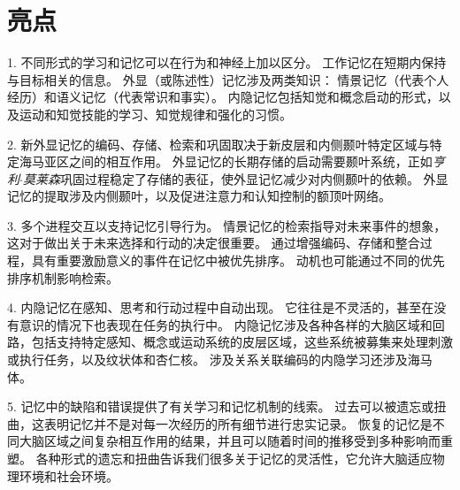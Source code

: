 \section{亮点}

1. 不同形式的学习和记忆可以在行为和神经上加以区分。
工作记忆在短期内保持与目标相关的信息。
外显（或陈述性）记忆涉及两类知识：
情景记忆（代表个人经历）和语义记忆（代表常识和事实）。
内隐记忆包括知觉和概念启动的形式，以及运动和知觉技能的学习、知觉规律和强化的习惯。 


2. 新外显记忆的编码、存储、检索和巩固取决于新皮层和内侧颞叶特定区域与特定海马亚区之间的相互作用。
外显记忆的长期存储的启动需要颞叶系统，正如\textit{亨利$\cdot$莫莱森}巩固过程稳定了存储的表征，使外显记忆减少对内侧颞叶的依赖。
外显记忆的提取涉及内侧颞叶，以及促进注意力和认知控制的额顶叶网络。


3. 多个进程交互以支持记忆引导行为。
情景记忆的检索指导对未来事件的想象，这对于做出关于未来选择和行动的决定很重要。
通过增强编码、存储和整合过程，具有重要激励意义的事件在记忆中被优先排序。
动机也可能通过不同的优先排序机制影响检索。 


4. 内隐记忆在感知、思考和行动过程中自动出现。
它往往是不灵活的，甚至在没有意识的情况下也表现在任务的执行中。
内隐记忆涉及各种各样的大脑区域和回路，包括支持特定感知、概念或运动系统的皮层区域，这些系统被募集来处理刺激或执行任务，以及纹状体和杏仁核。
涉及关系关联编码的内隐学习还涉及海马体。


5. 记忆中的缺陷和错误提供了有关学习和记忆机制的线索。
过去可以被遗忘或扭曲，这表明记忆并不是对每一次经历的所有细节进行忠实记录。
恢复的记忆是不同大脑区域之间复杂相互作用的结果，并且可以随着时间的推移受到多种影响而重塑。
各种形式的遗忘和扭曲告诉我们很多关于记忆的灵活性，它允许大脑适应物理环境和社会环境。


